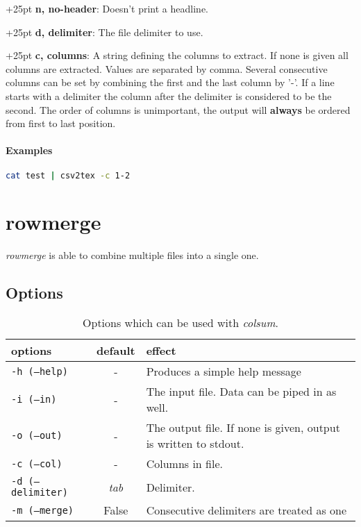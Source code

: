 \documentclass[a4paper,10pt,parskip=half]{scrreprt}
\begin{document}
\hangindent+25pt 
\textbf{n, no-header}: Doesn't print a headline.

\hangindent+25pt 
\textbf{d, delimiter}: The file delimiter to use. 

\hangindent+25pt 
\textbf{c, columns}: A string defining the columns to extract. If none is given all columns are extracted. Values are separated by comma. Several consecutive columns can be set by combining the first and the last column by '-'. If a line starts with a delimiter the column after the delimiter is considered to be the second. The order of columns is unimportant, the output will \textbf{always} be ordered from first to last position.



\subsubsection*{Examples}
\begin{lstlisting}[language=bash,frame=none,morekeywords={PROMPT}]
cat test | csv2tex -c 1-2
\end{lstlisting}



\chapter{rowmerge}


\textit{rowmerge} is able to combine multiple files into a single one. 

\section{Options}
\begin{table}[h]
\caption{Options which can be used with \textit{colsum}.}
\begin{tabular}{lcp{7cm}}\hline
options& default & effect \\\hline
 \texttt{-h (--help)}&- & Produces a simple help message\\
 \texttt{-i (--in)} &-& The input file. Data can be piped in as well.\\
 \texttt{-o (--out)} &-& The output file. If none is given, output is written to stdout.\\
 \texttt{-c (--col)} &-& Columns in file.\\
 \texttt{-d (--delimiter)} & \textit{tab} & Delimiter. \\
 \texttt{-m (--merge)} & False & Consecutive delimiters are treated as one

\end{tabular}
\end{table}
\end{document}
